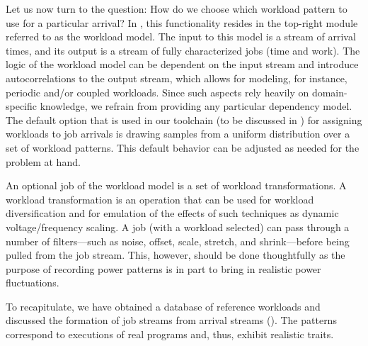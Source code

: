 Let us now turn to the question: How do we choose which workload pattern to use
for a particular arrival? In , this functionality resides in the
top-right module referred to as the workload model. The input to this model is a
stream of arrival times, and its output is a stream of fully characterized jobs
(time and work). The logic of the workload model can be dependent on the input
stream and introduce autocorrelations to the output stream, which allows for
modeling, for instance, periodic and/or coupled workloads. Since such aspects
rely heavily on domain-specific knowledge, we refrain from providing any
particular dependency model. The default option that is used in our toolchain
(to be discussed in ) for assigning workloads to job arrivals is
drawing samples from a uniform distribution over a set of workload patterns.
This default behavior can be adjusted as needed for the problem at hand.

An optional job of the workload model is a set of workload transformations. A
workload transformation is an operation that can be used for workload
diversification and for emulation of the effects of such techniques as dynamic
voltage/frequency scaling. A job (with a workload selected) can pass through a
number of filters---such as noise, offset, scale, stretch, and shrink---before
being pulled from the job stream. This, however, should be done thoughtfully as
the purpose of recording power patterns is in part to bring in realistic power
fluctuations.

To recapitulate, we have obtained a database of reference workloads and
discussed the formation of job streams from arrival streams ().
The patterns correspond to executions of real programs and, thus, exhibit
realistic traits.
